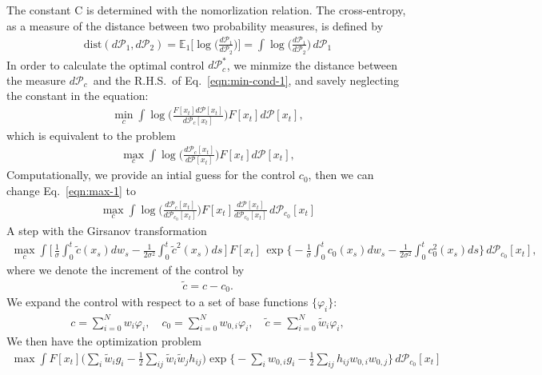 \documentclass[aip,jcp,a4paper,reprint,onecolumn]{revtex4-1}
\newcommand{\pathmeas}{d\mathcal P}
\newcommand{\dist}{\textrm{dist}}
\begin{document}
The constant \textrm{C} is determined with the nomorlization relation.
The cross-entropy, as a measure of the distance between two
probability measures, is defined by
\begin{align}
  \dist(\pathmeas_1, \pathmeas_2)
  = \mathbb E_1 \Big[\log \Big(\frac{\pathmeas_1}{\pathmeas_2}\Big)\Big]
  = \int \log \Big(\frac{\pathmeas_1}{\pathmeas_2}\Big)\, \pathmeas_1
\end{align}
In order to calculate the optimal control $\pathmeas_c^\ast$, we
minmize the distance between the measure $\pathmeas_c$~and the
R.H.S.~of Eq.~\eqref{eqn:min-cond-1}, and savely neglecting the
constant in the equation:
\begin{align}
  \min_c \int  \log \Big( \frac{F[x_t]\pathmeas[x_t]}{\pathmeas_c[x_t]} \Big) F[x_t]\pathmeas[x_t],
\end{align}
which is equivalent to the problem
\begin{align}\label{eqn:max-1}
  \max_c \int \log \Big(\frac{\pathmeas_c[x_t]}{\pathmeas[x_t]} \Big) F[x_t]\pathmeas[x_t],
\end{align}
Computationally, we provide an intial guess for the control $c_0$, then we can change Eq.~\eqref{eqn:max-1} to
\begin{align}
  \max_c \int
  \log \Big(\frac{\pathmeas_c[x_t]}{\pathmeas_{c_0}[x_t]} \Big)
  F[x_t]
  \frac{\pathmeas[x_t]}{\pathmeas_{c_0}[x_t]}
  \,\pathmeas_{c_0}[x_t]
\end{align}
A step with the Girsanov transformation
\begin{align}
  \max_c \int
  \Big[\, \frac1\sigma\int_0^t\tilde c(x_s) dw_s - \frac 1{2\sigma^2} \int_0^t\tilde c^2(x_s) ds \,\Big]
  \,F[x_t]\,
  \exp
  \Big\{ -\frac1\sigma\int_0^t c_0(x_s) dw_s - \frac 1{2\sigma^2} \int_0^t c_0^2(x_s) ds \Big \}
  \,\pathmeas_{c_0}[x_t],
\end{align}
where we denote the increment of the control by
\begin{align}
  \tilde c = c - c_0.
\end{align}
We expand the control with respect to a set of base functions $\{\varphi_i\}$:
\begin{align}
  c = \sum_{i=0}^N w_i\varphi_i, \quad c_0 = \sum_{i=0}^N w_{0,i}\varphi_i, \quad \tilde c = \sum_{i=0}^N \tilde w_i\varphi_i,
\end{align}
We then have the optimization problem
\begin{align}
  \max \int F[x_t]
  \Big ( \sum_i \tilde w_i g_i - \frac12\sum_{ij} \tilde w_i\tilde w_j h_{ij} \Big)
  \exp \Big\{
  - \sum_i w_{0,i} g_i - \frac 12 \sum_{ij} h_{ij} w_{0,i}    w_{0,j} \Big\}
  \,\pathmeas_{c_0}[x_t]
\end{align}
\end{document}
